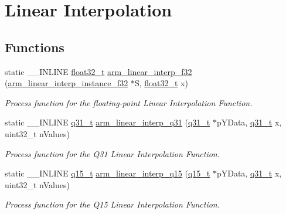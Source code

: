 \hypertarget{group___linear_interpolate}{}\section{Linear Interpolation}
\label{group___linear_interpolate}
\subsection*{Functions}
\begin{DoxyCompactItemize}
\item 
static \+\_\+\+\_\+\+I\+N\+L\+I\+NE \hyperlink{arm__math_8h_a4611b605e45ab401f02cab15c5e38715}{float32\+\_\+t} \hyperlink{group___linear_interpolate_ga2269263d810cafcd19681957b37d5cf6}{arm\+\_\+linear\+\_\+interp\+\_\+f32} (\hyperlink{structarm__linear__interp__instance__f32}{arm\+\_\+linear\+\_\+interp\+\_\+instance\+\_\+f32} $\ast$S, \hyperlink{arm__math_8h_a4611b605e45ab401f02cab15c5e38715}{float32\+\_\+t} x)
\begin{DoxyCompactList}\small\item\em Process function for the floating-\/point Linear Interpolation Function. \end{DoxyCompactList}\item 
static \+\_\+\+\_\+\+I\+N\+L\+I\+NE \hyperlink{arm__math_8h_adc89a3547f5324b7b3b95adec3806bc0}{q31\+\_\+t} \hyperlink{group___linear_interpolate_ga690e63e9a513ca0a741b1b174805d031}{arm\+\_\+linear\+\_\+interp\+\_\+q31} (\hyperlink{arm__math_8h_adc89a3547f5324b7b3b95adec3806bc0}{q31\+\_\+t} $\ast$p\+Y\+Data, \hyperlink{arm__math_8h_adc89a3547f5324b7b3b95adec3806bc0}{q31\+\_\+t} x, uint32\+\_\+t n\+Values)
\begin{DoxyCompactList}\small\item\em Process function for the Q31 Linear Interpolation Function. \end{DoxyCompactList}\item 
static \+\_\+\+\_\+\+I\+N\+L\+I\+NE \hyperlink{arm__math_8h_ab5a8fb21a5b3b983d5f54f31614052ea}{q15\+\_\+t} \hyperlink{group___linear_interpolate_ga42c9206e5d2d22b8808716dc30622846}{arm\+\_\+linear\+\_\+interp\+\_\+q15} (\hyperlink{arm__math_8h_ab5a8fb21a5b3b983d5f54f31614052ea}{q15\+\_\+t} $\ast$p\+Y\+Data, \hyperlink{arm__math_8h_adc89a3547f5324b7b3b95adec3806bc0}{q31\+\_\+t} x, uint32\+\_\+t n\+Values)
\begin{DoxyCompactList}\small\item\em Process function for the Q15 Linear Interpolation Function. \end{DoxyCompactList}\item 

\end{DoxyCompactItemize}
